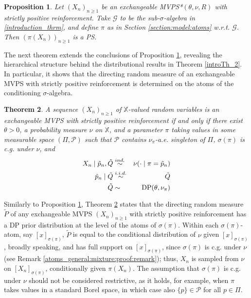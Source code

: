 \documentclass[a4paper]{article}
\theoremstyle{plain}
\newtheorem{theorem}{Theorem}
\newtheorem{proposition}[theorem]{Proposition}
\theoremstyle{remark}
\theoremstyle{definition}
\begin{document}
\begin{proposition}\label{atoms_general}
Let $(X_n)_{n\geq 1}$ be an exchangeable MVPS*$(\theta,\nu,R)$ with strictly positive reinforcement. Take $\mathcal{G}$ to be the sub-$\sigma$-algebra in \eqref{introduction_thrm}, and define $\pi$ as in Section \ref{section:model:atoms} w.r.t. $\mathcal{G}$. Then $(\pi(X_n))_{n\geq 1}$ is a PS.
\end{proposition}

The next theorem extends the conclusions of Proposition \ref{atoms_general}, revealing the hierarchical structure behind the distributional results in Theorem \ref{introTh_2}. In particular, it shows that the directing random measure of an exchangeable MVPS with strictly positive reinforcement is determined on the atoms of the conditioning $\sigma$-algebra.

\begin{theorem}\label{atoms_general:mixture}
A sequence $(X_n)_{n\geq 1}$ of $\mathbb{X}$-valued random variables is an exchangeable MVPS with strictly positive reinforcement if and only if there exist $\theta>0$, a probability measure $\nu$ on $\mathbb{X}$, and a parameter $\pi$ taking values in some measurable space $(\Pi,\mathcal{P})$ such that $\mathcal{P}$ contains $\nu_\pi$-a.e. singleton of $\Pi$, $\sigma(\pi)$ is c.g. under $\nu$, and
\begin{eqnarray}\label{atoms_general:mixture:eq}
X_n \mid \tilde{p}_n,\tilde{Q} & \overset{ind.}{\sim} & \nu(\cdot\mid\pi=\tilde{p}_n) \nonumber\\
\tilde{p}_n\mid \tilde{Q} & \overset{i.i.d.}{\sim} & \tilde{Q} \\
\tilde{Q} & \sim & \textnormal{DP}(\theta,\nu_\pi) \nonumber
\end{eqnarray}
\end{theorem}

Similarly to Proposition \ref{atoms_general}, Theorem \ref{atoms_general:mixture} states that the directing random measure $\tilde{P}$ of any exchangeable MVPS $(X_n)_{n\geq1}$ with strictly positive reinforcement has a DP prior distribution at the level of the atoms of $\sigma(\pi)$. Within each $\sigma(\pi)$-atom, say $[x]_{\sigma(\pi)}$, $\tilde{P}$ is equal to the conditional distribution of $\nu$ given $[x]_{\sigma(\pi)}$, broadly speaking, and has full support on $[x]_{\sigma(\pi)}$, since $\sigma(\pi)$ is c.g. under $\nu$ (see Remark \ref{atoms_general:mixture:proof:remark}); thus, $X_n$ is sampled from $\nu$ on $[X_n]_{\sigma(\pi)}$, conditionally given $\pi(X_n)$. The assumption that $\sigma(\pi)$ is c.g. under $\nu$ should not be considered restrictive, as it holds, for example, when $\pi$ takes values in a standard Borel space, in which case also $\{p\}\in\mathcal{P}$ for all $p\in\Pi$.
\end{document}
